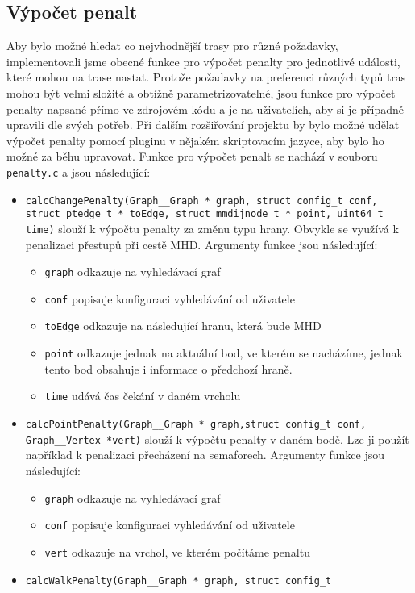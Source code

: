 \subsection{Výpočet penalt}
Aby bylo možné hledat co nejvhodnější trasy pro různé požadavky, implementovali
jsme obecné funkce pro výpočet penalty pro jednotlivé události, které mohou na
trase nastat. Protože požadavky na preferenci různých typů tras mohou být velmi
složité a obtížně parametrizovatelné, jsou funkce pro výpočet penalty napsané
přímo ve zdrojovém kódu a je na uživatelích, aby si je případně upravili dle
svých potřeb. Při dalším rozšiřování projektu by bylo možné udělat výpočet
penalty pomocí pluginu v nějakém skriptovacím jazyce, aby bylo ho možné za běhu
upravovat. Funkce pro výpočet penalt se nachází v souboru {\tt penalty.c} a jsou následující: 
\begin{itemize}
	\item {\tt calcChangePenalty(Graph\_\_Graph * graph, struct config\_t conf,
	struct ptedge\_t * toEdge, struct mmdijnode\_t * point, uint64\_t time)}
	slouží k výpočtu penalty za změnu typu hrany. Obvykle se využívá k
	penalizaci přestupů při cestě MHD.
	Argumenty funkce jsou následující:
	\begin{itemize}
		\item {\tt graph} odkazuje na vyhledávací graf
		\item {\tt conf} popisuje konfiguraci vyhledávání od uživatele
		\item {\tt toEdge} odkazuje na následující hranu, která bude MHD   
		\item {\tt point} odkazuje jednak na aktuální bod, ve kterém se
		nacházíme, jednak tento bod obsahuje i informace o předchozí
		hraně.
		\item {\tt time} udává čas čekání v daném vrcholu
	\end{itemize}
	\item {\tt calcPointPenalty(Graph\_\_Graph * graph,struct config\_t conf,
	Graph\_\_Vertex *vert)} slouží k výpočtu penalty v daném bodě. Lze ji
	použít například k penalizaci přecházení na semaforech. Argumenty
	funkce jsou následující:
	\begin{itemize}
		\item {\tt graph} odkazuje na vyhledávací graf
		\item {\tt conf} popisuje konfiguraci vyhledávání od uživatele
		\item {\tt vert} odkazuje na vrchol, ve kterém počítáme penaltu
	\end{itemize}
	\item {\tt calcWalkPenalty(Graph\_\_Graph * graph, struct config\_t
}
\end{itemize}
